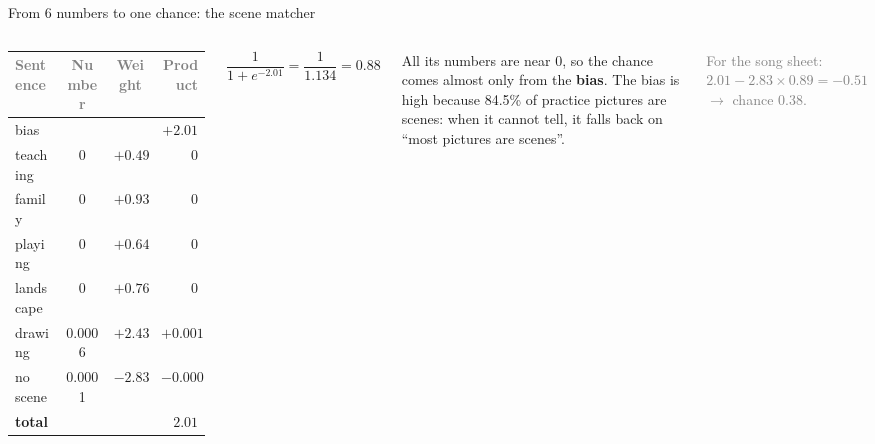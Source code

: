 \documentclass[aspectratio=169,11pt]{beamer}
\renewcommand{\arraystretch}{1.3}
\newcommand{\h}[1]{\textcolor{grey}{#1}}
\begin{document}
\begin{frame}{From 6 numbers to one chance: the scene matcher}
\begin{columns}[T]
\footnotesize\renewcommand{\arraystretch}{1.12}
\begin{tabular}{@{}l c c r@{}}
\toprule
\h{Sentence} & \h{Number} & \h{Weight} & \h{Product}\\
\midrule
bias & & & $+2.01$\\
teaching & 0 & $+0.49$ & 0\\
family & 0 & $+0.93$ & 0\\
playing & 0 & $+0.64$ & 0\\
landscape & 0 & $+0.76$ & 0\\
drawing & 0.0006 & $+2.43$ & $+0.001$\\
no scene & 0.0001 & $-2.83$ & $-0.000$\\
\midrule
\textbf{total} & & & $\mathbf{2.01}$\\
\bottomrule
\end{tabular}
\[ \frac{1}{1 + e^{-2.01}} = \frac{1}{1.134} = \mathbf{0.88} \]

\vspace{0.2cm}
All its numbers are near 0, so the chance comes almost only from the \textbf{bias}. The bias is high because 84.5\% of practice pictures are scenes: when it cannot tell, it falls back on ``most pictures are scenes''.

\vspace{0.2cm}
\textcolor{grey}{For the song sheet: $2.01 - 2.83 \times 0.89 = -0.51$ $\to$ chance 0.38.}
\end{columns}
\end{frame}
\end{document}

